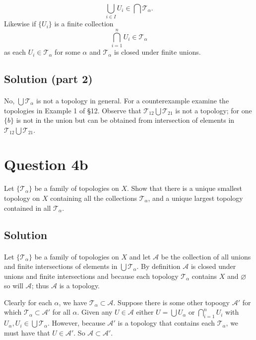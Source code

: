 \documentclass[11pt, oneside]{article}   	%
\begin{document}
\[
\bigcup_{i \in I} U_i \in \bigcap \mathscr{T}_\alpha .
\]
Likewise if $\{U_i\}$ is a finite collection
\[
\bigcap_{i=1}^n U_i \in \mathscr{T}_\alpha
\]
as each $U_i \in \mathscr{T}_\alpha$ for some $\alpha$ and $\mathscr{T}_\alpha$ is closed under finite unions.

\subsection*{Solution (part 2)}
\paragraph{}
No, $\bigcup \mathscr{T}_\alpha$ is not a topology in general. For a counterexample examine the topologies in Example 1 of \S12. Observe that $\mathscr{T}_{12} \bigcup \mathscr{T}_{21}$ is not a topology; for one $\{b\}$ is not in the union but can be obtained from intersection of elements in $\mathscr{T}_{12} \bigcup \mathscr{T}_{21}$.


\section*{Question 4b}
\paragraph{}

Let $\{ \mathscr{T}_\alpha\}$ be a family of topologies on $X$. Show that there is a unique smallest topology on $X$ containing all the collections $\mathscr{T}_\alpha$, and a unique largest topology contained in all $\mathscr{T}_\alpha$.

\subsection*{Solution}
\paragraph{}

Let $\{ \mathscr{T}_\alpha\}$ be a family of topologies on $X$ and let $\mathscr{A}$ be the collection of all unions and finite intersections of elements in $\bigcup \mathscr{T}_\alpha$. By definition $\mathscr{A}$ is closed under unions and finite intersections and because each topology $\mathscr{T}_\alpha$ contains $X$ and $\varnothing$ so will $\mathscr{A}$; thus $\mathscr{A}$ is a topology.

Clearly for each $\alpha$, we have $\mathscr{T}_\alpha \subset \mathscr{A}$. Suppose there is some other topoogy $\mathscr{A}'$ for which $\mathscr{T}_\alpha \subset \mathscr{A}'$ for all $\alpha$. Given any $U \in \mathscr{A}$ either $U =  \bigcup U_{\alpha}$ or $\bigcap_{i=1}^n U_i$ with $U_\alpha, U_i \in \bigcup \mathscr{T}_\alpha$. However, because $\mathscr{A}'$ is a topology that contains each $\mathscr{T}_\alpha$, we must have that $U \in \mathscr{A}'$. So $\mathscr{A} \subset \mathscr{A}'$.
\end{document}
